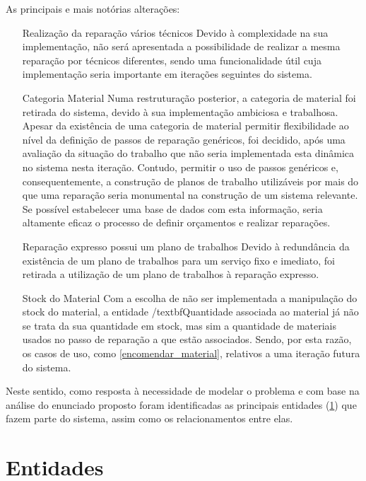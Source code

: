 \documentclass[a4paper,12pt]{scrreprt}
\begin{document}
As principais e mais notórias alterações:
\begin{itemize}
    \item[Realização da reparação vários técnicos] {Devido à complexidade na sua implementação,
    não será apresentada a possibilidade de realizar a mesma reparação por técnicos diferentes, sendo uma funcionalidade útil cuja 
    implementação seria importante em iterações seguintes do sistema.
    }
    \item[Categoria Material] {Numa restruturação posterior, a categoria de material foi retirada do sistema, devido à sua implementação ambiciosa e trabalhosa.
    Apesar da existência de uma categoria de material permitir flexibilidade ao nível da definição de passos de reparação genéricos, foi decidido, após uma 
    avaliação da situação do trabalho que não seria implementada esta dinâmica no sistema nesta iteração. Contudo, permitir o uso de passos genéricos e,
    consequentemente, a construção de planos de trabalho utilizáveis por mais do que uma reparação seria monumental na construção de um sistema relevante. 
    Se possível estabelecer uma base de dados com esta informação, seria altamente eficaz o processo de definir orçamentos e realizar reparações.
    }
    \item[Reparação expresso possui um plano de trabalhos] {Devido à redundância da existência de um plano de trabalhos para um serviço fixo e imediato, foi retirada 
    a utilização de um plano de trabalhos à reparação expresso. 
    }
    \item[Stock do Material]{Com a escolha de não ser implementada a manipulação do stock do material, a entidade /textbf{Quantidade} associada ao material 
    já não se trata da sua quantidade em stock, mas sim a quantidade de materiais usados no passo de reparação a que estão associados.
    Sendo, por esta razão, os casos de uso, como  \ref{encomendar_material}, relativos a uma iteração futura do sistema.
    }
\end{itemize}

Neste sentido, como resposta à necessidade de modelar o problema e com base na análise do enunciado proposto foram identificadas as 
principais entidades (\ref{ent}) que fazem parte do sistema, assim como os relacionamentos entre elas. 

\section{Entidades}\label{ent}
\end{document}

